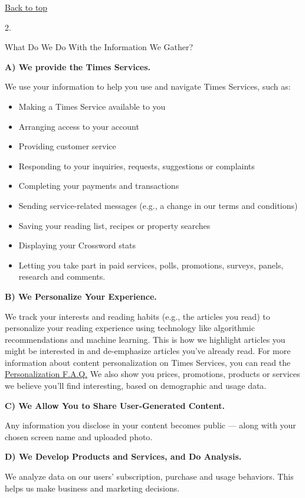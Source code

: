 \href{app}{Back to top}

2.

What Do We Do With the Information We Gather?

\textbf{A) We provide the Times Services.}

We use your information to help you use and navigate Times Services,
such as:

\begin{itemize}
\tightlist
\item
  Making a Times Service available to you
\item
  Arranging access to your account
\item
  Providing customer service
\item
  Responding to your inquiries, requests, suggestions or complaints
\item
  Completing your payments and transactions
\item
  Sending service-related messages (e.g., a change in our terms and
  conditions)
\item
  Saving your reading list, recipes or property searches
\item
  Displaying your Crossword stats
\item
  Letting you take part in paid services, polls, promotions, surveys,
  panels, research and comments.
\end{itemize}

\textbf{B) We Personalize Your Experience.}

We track your interests and reading habits (e.g., the articles you read)
to personalize your reading experience using technology like algorithmic
recommendations and machine learning. This is how we highlight articles
you might be interested in and de-emphasize articles you've already
read. For more information about content personalization on Times
Services, you can read the
\href{https://help.nytimes3xbfgragh.onion/hc/en-us/articles/360003965994-Personalization}{Personalization
F.A.Q.} We also show you prices, promotions, products or services we
believe you'll find interesting, based on demographic and usage data.

\textbf{C) We Allow You to Share User-Generated Content.}

Any information you disclose in your content becomes public --- along
with your chosen screen name and uploaded photo.

\textbf{D) We Develop Products and Services, and Do Analysis.}

We analyze data on our users' subscription, purchase and usage
behaviors. This helps us make business and marketing decisions.

